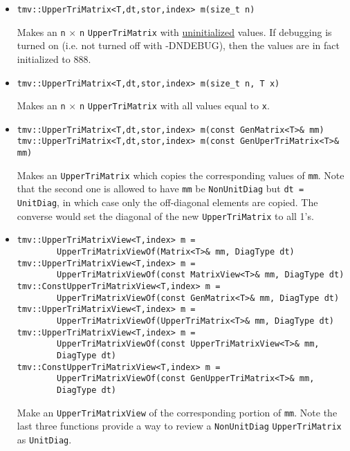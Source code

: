 \documentclass[twoside,letterpaper,11pt]{article}
\renewcommand{\tt}[1]{{\texttt {#1}}}
\begin{document}
\begin{itemize}
\item 
\begin{verbatim}
tmv::UpperTriMatrix<T,dt,stor,index> m(size_t n)
\end{verbatim}
Makes an \tt{n} $\times$ \tt{n} \tt{UpperTriMatrix} with \underline{uninitialized} values.
If debugging is turned on (i.e. not turned off
with -DNDEBUG), then the values are in fact initialized to 888.  

\item
\begin{verbatim}
tmv::UpperTriMatrix<T,dt,stor,index> m(size_t n, T x)
\end{verbatim}
Makes an \tt{n} $\times$ \tt{n} \tt{UpperTriMatrix} with all values equal to \tt{x}.

\item 
\begin{verbatim}
tmv::UpperTriMatrix<T,dt,stor,index> m(const GenMatrix<T>& mm)
tmv::UpperTriMatrix<T,dt,stor,index> m(const GenUperTriMatrix<T>& mm)
\end{verbatim}
Makes an \tt{UpperTriMatrix} which copies the corresponding values of
\tt{mm}.  Note that the second one is allowed to have \tt{mm} be
\tt{NonUnitDiag} but \tt{dt = UnitDiag}, in which case only the 
off-diagonal elements are copied.  The converse would set the 
diagonal of the new \tt{UpperTriMatrix} to all 1's.

\item
\begin{verbatim}
tmv::UpperTriMatrixView<T,index> m = 
        UpperTriMatrixViewOf(Matrix<T>& mm, DiagType dt)
tmv::UpperTriMatrixView<T,index> m = 
        UpperTriMatrixViewOf(const MatrixView<T>& mm, DiagType dt)
tmv::ConstUpperTriMatrixView<T,index> m = 
        UpperTriMatrixViewOf(const GenMatrix<T>& mm, DiagType dt)
tmv::UpperTriMatrixView<T,index> m = 
        UpperTriMatrixViewOf(UpperTriMatrix<T>& mm, DiagType dt)
tmv::UpperTriMatrixView<T,index> m = 
        UpperTriMatrixViewOf(const UpperTriMatrixView<T>& mm, 
        DiagType dt)
tmv::ConstUpperTriMatrixView<T,index> m = 
        UpperTriMatrixViewOf(const GenUpperTriMatrix<T>& mm, 
        DiagType dt)
\end{verbatim}
Make an \tt{UpperTriMatrixView} of the corresponding portion of \tt{mm}. 
Note the last three functions provide a way to review a 
\tt{NonUnitDiag} \tt{UpperTriMatrix} as \tt{UnitDiag}.


\end{itemize}
\end{document}
